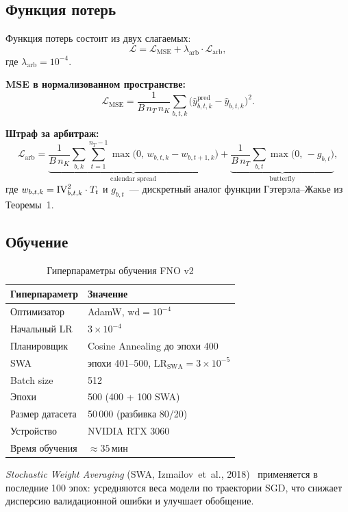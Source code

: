 \subsection{Функция потерь}
\label{sec:loss}

Функция потерь состоит из двух слагаемых:
\begin{equation}
  \label{eq:loss}
  \mathcal{L} = \mathcal{L}_{\mathrm{MSE}} + \lambda_{\mathrm{arb}}
                \cdot \mathcal{L}_{\mathrm{arb}},
\end{equation}
где $\lambda_{\mathrm{arb}} = 10^{-4}$.

\textbf{MSE в нормализованном пространстве:}
\[
  \mathcal{L}_{\mathrm{MSE}} = \frac{1}{B\,n_T\,n_K}\sum_{b,t,k}
  \bigl(\hat y_{b,t,k}^{\mathrm{pred}} - \hat y_{b,t,k}\bigr)^2.
\]

\textbf{Штраф за арбитраж:}
\begin{equation}
  \label{eq:arb_loss}
  \mathcal{L}_{\mathrm{arb}} = \underbrace{
    \frac{1}{B\,n_K}\sum_{b,k}\sum_{t=1}^{n_T-1}
    \max\!\bigl(0,\, w_{b,t,k} - w_{b,t+1,k}\bigr)
  }_{\text{calendar spread}} +
  \underbrace{
    \frac{1}{B\,n_T}\sum_{b,t}
    \max\!\bigl(0,\, -g_{b,t}\bigr)
  }_{\text{butterfly}},
\end{equation}
где $w_{b,t,k} = \mathrm{IV}_{b,t,k}^2 \cdot T_t$ и $g_{b,t}$~--- дискретный
аналог функции Гэтерэла--Жакье из Теоремы~1.

\subsection{Обучение}

\begin{table}[H]
\centering
\caption{Гиперпараметры обучения FNO v2}
\label{tab:train_hp}
\begin{tabular}{ll}
\toprule
Гиперпараметр & Значение \\
\midrule
Оптимизатор       & AdamW, $\text{wd}=10^{-4}$ \\
Начальный LR      & $3\times10^{-4}$ \\
Планировщик       & Cosine Annealing до эпохи 400 \\
SWA               & эпохи 401--500, $\text{LR}_{\text{SWA}}=3\times10^{-5}$ \\
Batch size        & 512 \\
Эпохи             & 500 (400 + 100 SWA) \\
Размер датасета   & 50\,000 (разбивка 80/20) \\
Устройство        & NVIDIA RTX 3060 \\
Время обучения    & $\approx 35\,\text{мин}$ \\
\bottomrule
\end{tabular}
\end{table}

\textit{Stochastic Weight Averaging} (SWA, Izmailov~et~al., 2018)~\cite{Izmailov2018}
применяется в последние 100 эпох: усредняются веса модели по траектории
SGD, что снижает дисперсию валидационной ошибки и улучшает обобщение.
